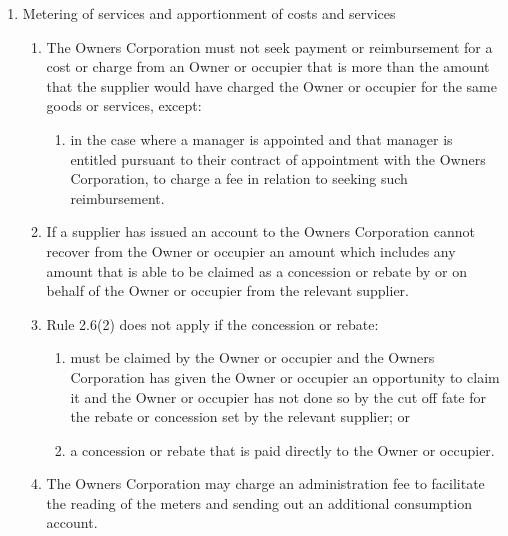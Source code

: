 \documentclass{article}
\begin{document}
\begin{enumerate}[label=\arabic*.]
\begin{enumerate}[label=\arabic{enumi}.\arabic*.]
\begin{enumerate}[label=(\arabic*)]
\begin{enumerate}[label=(\alph*)]
\end{enumerate}

\end{enumerate}

\item  Metering of services and apportionment of costs and services

\begin{enumerate}[label=(\arabic*)]

\item  The Owners Corporation must not seek payment or reimbursement for a cost or charge from an Owner or occupier that is more than the amount that the supplier would have charged the Owner or occupier for the same goods or services, except:

\begin{enumerate}[label=(\alph*)]

\item  in the case where a manager is appointed and that manager is entitled pursuant to their contract of appointment with the Owners Corporation, to charge a fee in relation to seeking such reimbursement.

\end{enumerate}

\item  If a supplier has issued an account to the Owners Corporation cannot recover from the Owner or occupier an amount which includes any amount that is able to be claimed as a concession or rebate by or on behalf of the Owner or occupier from the relevant supplier.

\item  Rule 2.6(2) does not apply if the concession or rebate:

\begin{enumerate}[label=(\alph*)]

\item  must be claimed by the Owner or occupier and the Owners Corporation has given the Owner or occupier an opportunity to claim it and the Owner or occupier has not done so by the cut off fate for the rebate or concession set by the relevant supplier; or

\item  a concession or rebate that is paid directly to the Owner or occupier.
\newpage



\end{enumerate}

\item  The Owners Corporation may charge an administration fee to facilitate the reading of the meters and sending out an additional consumption account.


\end{enumerate}
\end{enumerate}
\end{enumerate}
\end{document}
